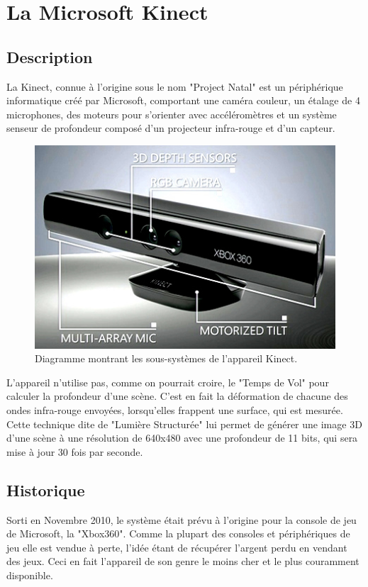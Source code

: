 \section{La Microsoft Kinect}

\subsection{Description}
La Kinect, connue à l'origine sous le nom "Project Natal" est un
périphérique informatique créé par Microsoft, comportant une caméra
couleur, un étalage de 4 microphones, des moteurs pour s'orienter avec 
accéléromètres 
et un système senseur de profondeur composé d'un 
projecteur infra-rouge et d'un capteur. 
  \begin{figure}[h!]
  \centering
  \includegraphics[width=0.8\linewidth]{images/kinect_diagram}
  \caption{Diagramme montrant les sous-systèmes de l'appareil Kinect.}
  \end{figure}
L'appareil n'utilise pas, comme on pourrait croire, le "Temps de Vol" pour
calculer la profondeur d'une scène. C'est en fait la déformation de chacune des 
ondes infra-rouge envoyées, lorsqu'elles frappent une surface, qui est mesurée. Cette technique dite de 
"Lumière Structurée"
lui permet de générer une image 3D d'une scène à une résolution de 640x480 avec 
une profondeur de 11 bits, qui sera mise à jour 30 fois par seconde.

\subsection{Historique}
Sorti en Novembre 2010, le système était prévu à l'origine pour la console
de jeu de Microsoft, la "Xbox360". Comme la plupart des consoles et
périphériques de jeu elle
est vendue à perte, l'idée étant de récupérer l'argent perdu en vendant
des jeux. Ceci en fait l'appareil de son genre le moins cher et le plus couramment
disponible.

